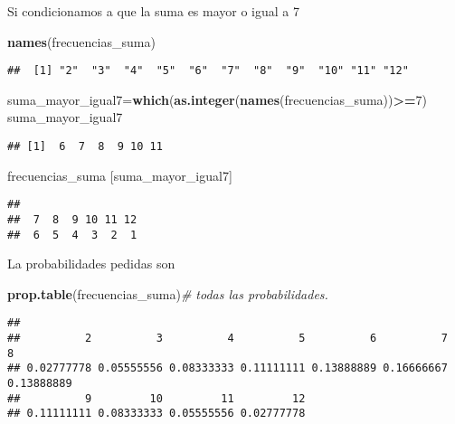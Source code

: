 \documentclass[
]{article}
\newenvironment{Shaded}{\begin{snugshade}}{\end{snugshade}}
\newcommand{\CommentTok}[1]{\textcolor[rgb]{0.56,0.35,0.01}{\textit{#1}}}
\newcommand{\DecValTok}[1]{\textcolor[rgb]{0.00,0.00,0.81}{#1}}
\newcommand{\KeywordTok}[1]{\textcolor[rgb]{0.13,0.29,0.53}{\textbf{#1}}}
\newcommand{\NormalTok}[1]{#1}
\newcommand{\OperatorTok}[1]{\textcolor[rgb]{0.81,0.36,0.00}{\textbf{#1}}}
\begin{document}
Si condicionamos a que la suma es mayor o igual a 7

\begin{Shaded}
\begin{Highlighting}[]
\KeywordTok{names}\NormalTok{(frecuencias\_suma)}
\end{Highlighting}
\end{Shaded}

\begin{verbatim}
##  [1] "2"  "3"  "4"  "5"  "6"  "7"  "8"  "9"  "10" "11" "12"
\end{verbatim}

\begin{Shaded}
\begin{Highlighting}[]
\NormalTok{suma\_mayor\_igual7=}\KeywordTok{which}\NormalTok{(}\KeywordTok{as.integer}\NormalTok{(}\KeywordTok{names}\NormalTok{(frecuencias\_suma))}\OperatorTok{\textgreater{}=}\DecValTok{7}\NormalTok{)}
\NormalTok{suma\_mayor\_igual7}
\end{Highlighting}
\end{Shaded}

\begin{verbatim}
## [1]  6  7  8  9 10 11
\end{verbatim}

\begin{Shaded}
\begin{Highlighting}[]
\NormalTok{frecuencias\_suma [suma\_mayor\_igual7]}
\end{Highlighting}
\end{Shaded}

\begin{verbatim}
## 
##  7  8  9 10 11 12 
##  6  5  4  3  2  1
\end{verbatim}

La probabilidades pedidas son

\begin{Shaded}
\begin{Highlighting}[]
\KeywordTok{prop.table}\NormalTok{(frecuencias\_suma)}\CommentTok{\# todas las probabilidades.}
\end{Highlighting}
\end{Shaded}

\begin{verbatim}
## 
##          2          3          4          5          6          7          8 
## 0.02777778 0.05555556 0.08333333 0.11111111 0.13888889 0.16666667 0.13888889 
##          9         10         11         12 
## 0.11111111 0.08333333 0.05555556 0.02777778
\end{verbatim}
\end{document}
